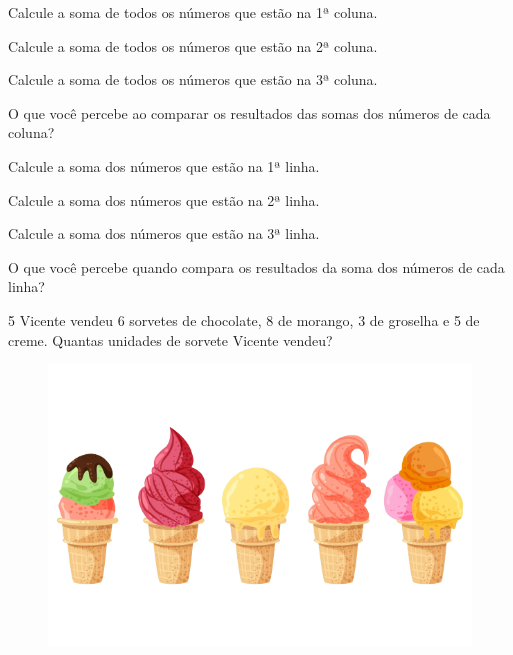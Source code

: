 \begin{escolha}
\item Calcule a soma de todos os números que estão na 1ª coluna.

\pagebreak
\item Calcule a soma de todos os números que estão na 2ª coluna.

\item Calcule a soma de todos os números que estão na 3ª coluna.

\item O que você percebe ao comparar os resultados das somas dos números de cada coluna?

\item Calcule a soma dos números que estão na 1ª linha.

\item Calcule a soma dos números que estão na 2ª linha.

\item Calcule a soma dos números que estão na 3ª linha.

\item O que você percebe quando compara os resultados da soma dos números de cada linha?
\end{escolha}

\num{5} Vicente vendeu 6 sorvetes de chocolate, 8 de morango, 3
de groselha e 5 de creme. Quantas unidades de sorvete Vicente vendeu?
\begin{figure}[htpb!]
\centering
\includegraphics[width=.5\textwidth]{./media/image14a.png}
\end{figure}


